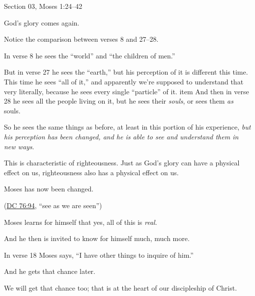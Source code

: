 \begin{compactitem}
			\item Section 03, Moses 1:24--42
				\begin{compactitem}
					\item God's glory comes again. 
					\item Notice the comparison between verses 8 and 27--28.
						\begin{compactitem}
							\item In verse 8 he sees the ``world'' and ``the children of men.''
							\item But in verse 27 he sees the ``earth,'' but his perception of it is different this time. This time he sees ``all of it,'' and apparently we're supposed to understand that very literally, because he sees every single ``particle'' of it. 
							item And then in verse 28 he sees all the people living on it, but he sees their \textit{souls}, or sees them \textit{as} souls.
							\item So he sees the same things as before, at least in this portion of his experience, \textit{but his perception has been changed, and he is able to see and understand them in new ways}.
							\item This is characteristic of righteousness. Just as God's glory can have a physical effect on us, righteousness also has a physical effect on us. 
							\item Moses has now been changed.
							\item (\hyperref[DC76-94]{DC 76:94}, ``see as we are seen'')
						\end{compactitem}
					\item Moses learns for himself that yes, all of this is \textit{real}.
					\item And he then is invited to know for himself much, much more.
						\begin{compactitem}
							\item In verse 18 Moses says, ``I have other things to inquire of him.''
							\item And he gets that chance later.
							\item We will get that chance too; that is at the heart of our discipleship of Christ.
						\end{compactitem} 
				\end{compactitem}
			

\end{compactitem}
